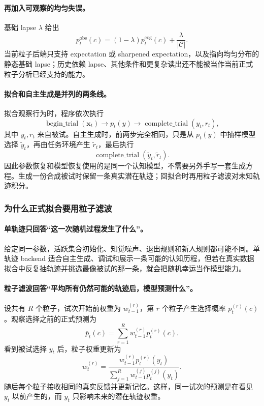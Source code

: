 \paragraph{再加入可观察的均匀失误。}
基础 lapse $\lambda$ 给出
\begin{equation}
p^{\mathrm{obs}}_t(c)
=(1-\lambda)p^{\mathrm{cog}}_t(c)
+\frac{\lambda}{|\mathcal C|}.
\label{eq:model0809-output-noise}
\end{equation}
当前粒子后端只支持 expectation 或 sharpened expectation，以及指向均匀分布的静态基础 lapse；历史依赖 lapse、其他条件和更复杂读出还不能被当作当前正式粒子分析已经支持的能力。

\paragraph{拟合和自主生成是并列的两条线。}
拟合观察行为时，程序依次执行
\begin{equation}
\operatorname{begin\_trial}(\mathbf x_t)
\rightarrow p_t(y)
\rightarrow
\operatorname{complete\_trial}(y_t,r_t),
\end{equation}
其中 $y_t,r_t$ 来自被试。自主生成时，前两步完全相同，只是从 $p_t(y)$ 中抽样模型选择 $\widetilde y_t$，再由任务环境产生 $\widetilde r_t$，最后执行
\begin{equation}
\operatorname{complete\_trial}(\widetilde y_t,\widetilde r_t).
\end{equation}
因此参数恢复和模型恢复使用的是同一个认知模型，不需要另外手写一套生成方程。生成一份合成被试时保留一条真实潜在轨迹；回拟合时再用粒子滤波对未知轨迹积分。


\subsubsection{为什么正式拟合要用粒子滤波}

\paragraph{单轨迹只回答“这一次随机过程发生了什么”。}
给定同一参数，活跃集合初始化、知觉噪声、退出规则和新人规则都可能不同。单轨迹 backend 适合自主生成、调试和展示一条可能的认知历程，但若在真实数据拟合中反复抽轨迹并挑选最像被试的那一条，就会把随机幸运当作模型能力。

\paragraph{粒子滤波回答“平均所有仍然可能的轨迹后，模型预测什么”。}
设共有 $R$ 个粒子，试次开始前权重为 $w^{(r)}_{t-1}$，第 $r$ 个粒子产生选择概率 $p^{(r)}_t(c)$。观察选择之前的正式预测为
\begin{equation}
\overline p_t(c)
=\sum_{r=1}^{R}w^{(r)}_{t-1}p^{(r)}_t(c).
\label{eq:model0809-particle-marginal}
\end{equation}
看到被试选择 $y_t$ 后，粒子权重更新为
\begin{equation}
w^{(r)}_t
=\frac{w^{(r)}_{t-1}p^{(r)}_t(y_t)}
{\sum_{j=1}^{R}w^{(j)}_{t-1}p^{(j)}_t(y_t)}.
\label{eq:model0809-particle-weight}
\end{equation}
随后每个粒子接收相同的真实反馈并更新记忆。这样，同一试次的预测是在看见 $y_t$ 以前产生的，而 $y_t$ 只影响未来的潜在轨迹权重。

